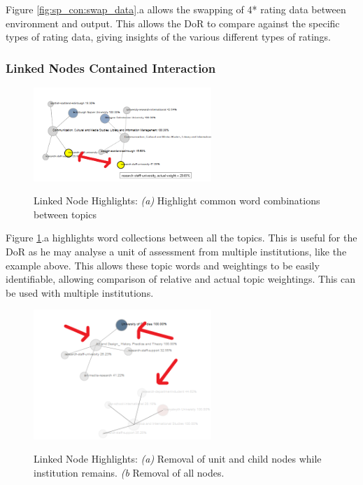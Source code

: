 \documentclass[a4paper, 11pt]{article}
\begin{document}
\noindent Figure \ref{fig:sp_con:swap_data}.a allows the swapping of 4* rating data between environment and output. This allows the DoR to compare against the specific types of rating data, giving insights of the various different types of ratings.


\subsubsection{Linked Nodes Contained Interaction}
\begin{figure}[hbt!]
	\centering
      \includegraphics[width=0.6\textwidth]{imgs/ln_int/topic_weight_highlight.png} \\
	\caption{Linked Node Highlights: 
	\textit{(a)} Highlight common word combinations between topics}
    \label{fig:lp_con:common_topic_words}
     \noindent\makebox[\linewidth]{\rule{\textwidth}{0.4pt}}
\end{figure}

\noindent Figure \ref{fig:lp_con:common_topic_words}.a highlights word collections between all the topics. This is useful for the DoR as he may analyse a unit of assessment from multiple institutions, like the example above. This allows these topic words and weightings to be easily identifiable, allowing comparison of relative and actual topic weightings. This can be used with multiple institutions. \\


\begin{figure}[hbt!]
	\centering
      \includegraphics[width=0.6\textwidth]{imgs/ln_int/remove_nodes.png} \\
	\caption{Linked Node Highlights: 
	\textit{(a)} Removal of unit and child nodes while institution remains.
	\textit{(b} Removal of all nodes.}
    \label{fig:lp_con:remove_nodes}
     \noindent\makebox[\linewidth]{\rule{\textwidth}{0.4pt}}
\end{figure}
\end{document}
